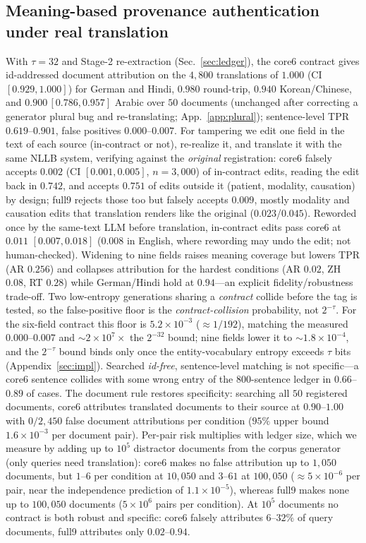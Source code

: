 \documentclass[journal]{IEEEtran}
\begin{document}
\subsection{Meaning-based provenance authentication under real translation}
\label{sec:provenance}
With $\tau{=}32$ and Stage-2 re-extraction (Sec.~\ref{sec:ledger}), the core6 contract gives id-addressed document attribution on the $4{,}800$ translations of $1.000$ (CI $[0.929,1.000]$) for German and Hindi, $0.980$ round-trip, $0.940$ Korean/Chinese, and $0.900\,[0.786,0.957]$ Arabic over $50$ documents (unchanged after correcting a generator plural bug and re-translating; App.~\ref{app:plural}); sentence-level TPR $0.619$--$0.901$, false positives $0.000$--$0.007$. For tampering we edit one field in the text of each source (in-contract or not), re-realize it, and translate it with the same NLLB system, verifying against the \emph{original} registration: core6 falsely accepts $0.002$ (CI $[0.001,0.005]$, $n{=}3{,}000$) of in-contract edits, reading the edit back in $0.742$, and accepts $0.751$ of edits outside it (patient, modality, causation) by design; full9 rejects those too but falsely accepts $0.009$, mostly modality and causation edits that translation renders like the original ($0.023$/$0.045$). Reworded once by the same-text LLM before translation, in-contract edits pass core6 at $0.011$ $[0.007,0.018]$ ($0.008$ in English, where rewording may undo the edit; not human-checked). Widening to nine fields raises meaning coverage but lowers TPR (AR $0.256$) and collapses attribution for the hardest conditions (AR $0.02$, ZH $0.08$, RT $0.28$) while German/Hindi hold at $0.94$---an explicit fidelity/robustness trade-off. Two low-entropy generations sharing a \emph{contract} collide before the tag is tested, so the false-positive floor is the \emph{contract-collision} probability, not $2^{-\tau}$. For the six-field contract this floor is $5.2\times10^{-3}$ ($\approx1/192$), matching the measured $0.000$--$0.007$ and $\sim\!2\times10^{7}\times$ the $2^{-32}$ bound; nine fields lower it to $\sim\!1.8\times10^{-4}$, and the $2^{-\tau}$ bound binds only once the entity-vocabulary entropy exceeds $\tau$ bits (Appendix~\ref{sec:impl}). Searched \emph{id-free}, sentence-level matching is not specific---a core6 sentence collides with some wrong entry of the $800$-sentence ledger in $0.66$--$0.89$ of cases. The document rule restores specificity: searching all $50$ registered documents, core6 attributes translated documents to their source at $0.90$--$1.00$ with $0/2{,}450$ false document attributions per condition ($95\%$ upper bound $1.6\times10^{-3}$ per document pair). Per-pair risk multiplies with ledger size, which we measure by adding up to $10^5$ distractor documents from the corpus generator (only queries need translation): core6 makes no false attribution up to $1{,}050$ documents, but $1$--$6$ per condition at $10{,}050$ and $3$--$61$ at $100{,}050$ ($\approx5\times10^{-6}$ per pair, near the independence prediction of $1.1\times10^{-5}$), whereas full9 makes none up to $100{,}050$ documents ($5\times10^{6}$ pairs per condition). At $10^5$ documents no contract is both robust and specific: core6 falsely attributes $6$--$32\%$ of query documents, full9 attributes only $0.02$--$0.94$.
\end{document}

